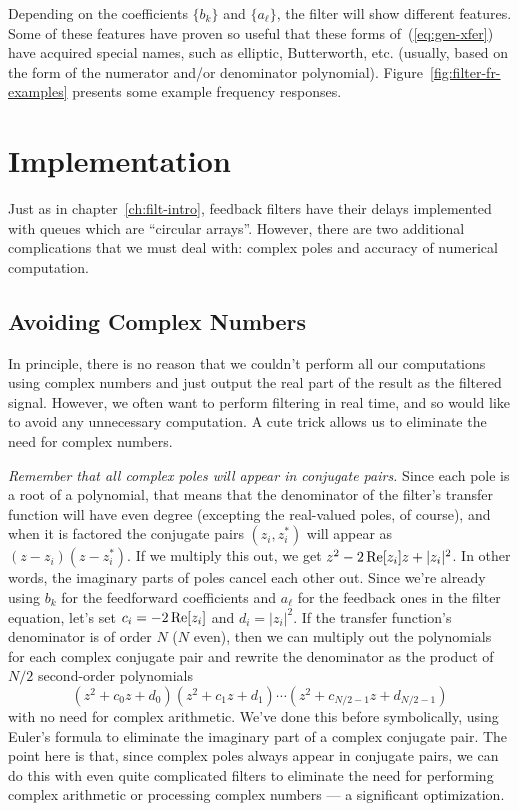 Depending on the coefficients $\{b_k\}$ and $\{a_\ell\}$, the
filter will show different features. Some of these features have
proven so useful that these forms of~(\ref{eq:gen-xfer}) have acquired
special names, such as elliptic, Butterworth, etc. (usually, based on
the form of the numerator and/or denominator
polynomial). Figure~\ref{fig:filter-fr-examples} presents some example
frequency responses.

\section{Implementation}

Just as in chapter~\ref{ch:filt-intro}, feedback filters have their
delays implemented with queues which are ``circular arrays''.
However, there are two additional complications that we must deal
with: complex poles and accuracy of numerical computation.

\subsection{Avoiding Complex Numbers}

In principle, there is no reason that we couldn't perform all our
computations using complex numbers and just output the real part of
the result as the filtered signal.  However, we often want to perform
filtering in real time, and so would like to avoid any unnecessary
computation. A cute trick allows us to eliminate the need for complex
numbers.

\emph{Remember that all complex poles will appear in conjugate pairs.}
Since each pole is a root of a polynomial, that means that the
denominator of the filter's transfer function will have even degree
(excepting the real-valued poles, of course), and when it is factored
the conjugate pairs $(z_i,z_i^*)$ will appear as $(z-z_i)(z-z_i^*)$.
If we multiply this out, we get $z^2 - 2\operatorname{Re}[z_i] z +|z_i|^2$. In
other words, the imaginary parts of poles cancel each other out.
Since we're already using $b_k$ for the feedforward coefficients and
$a_\ell$ for the feedback ones in the filter equation, let's set $c_i
= -2\operatorname{Re}[z_i]$ and $d_i = |z_i|^2$.  If the transfer function's
denominator is of order $N$ ($N$ even), then we can multiply out the
polynomials for each complex conjugate pair and rewrite the
denominator as the product of $N/2$ second-order polynomials
\begin{equation}
(z^2+c_0z+d_0)(z^2+c_1z+d_1)\cdots (z^2+c_{N/2-1}z+d_{N/2-1})
\end{equation}
with no need for complex arithmetic.  We've done this before
symbolically, using Euler's formula to eliminate the imaginary part of
a complex conjugate pair. The point here is that, since complex poles
always appear in conjugate pairs, we can do this with even quite
complicated filters to eliminate the need for performing complex
arithmetic or processing complex numbers --- a significant
optimization.

